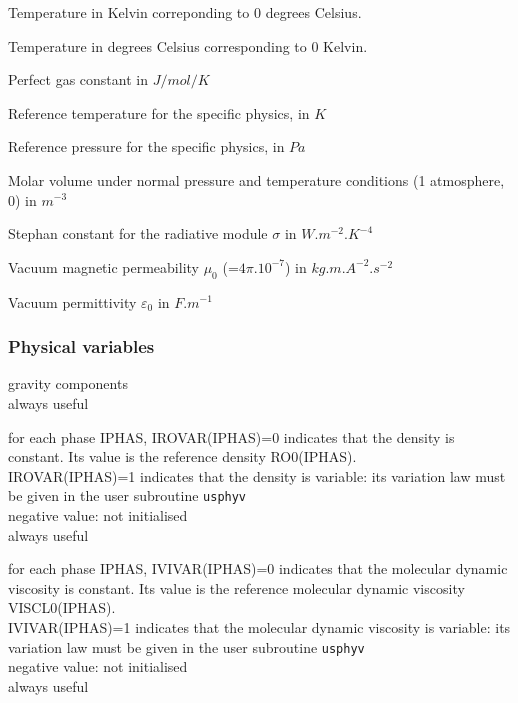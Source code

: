 {Temperature in Kelvin correponding to 0 degrees Celsius.}

{Temperature in degrees Celsius corresponding to 0 Kelvin.}

{Perfect gas constant in $J/mol/K$}

{Reference temperature for the specific physics, in $K$}

{Reference pressure for the specific physics, in $Pa$}

{Molar volume under normal pressure and temperature conditions (1 atmosphere,
0\degresC) in $m^{-3}$}

{Stephan constant for the radiative module $\sigma$ in $W.m^{-2}.K^{-4}$}

{Vacuum magnetic permeability $\mu_0$ (=$4\pi.10^{-7}$) in $kg.m.A^{-2}.s^{-2}$}

{Vacuum permittivity $\varepsilon_0$ in $F.m^{-1}$}



\subsubsection{Physical variables}

{gravity components\\
always useful }

{for each phase IPHAS, IROVAR(IPHAS)=0 indicates that the density is
constant. Its value is the reference density RO0(IPHAS).\\
IROVAR(IPHAS)=1 indicates that the density is variable: its variation
law must be given in the user subroutine \texttt{usphyv}\\
negative value: not initialised\\
always useful}

{for each phase IPHAS, IVIVAR(IPHAS)=0 indicates that the molecular
dynamic viscosity is constant. Its value is the reference molecular
dynamic viscosity VISCL0(IPHAS).\\
IVIVAR(IPHAS)=1 indicates that the molecular dynamic viscosity is
variable: its variation law must be given in the user subroutine
\texttt{usphyv}\\
negative value: not initialised\\
always useful}

